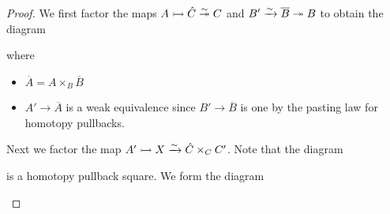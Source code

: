 \begin{lemma}
\begin{proof}
        We first factor the maps $A\xtailrightarrow{}\hat{C}\xtwoheadrightarrow[]{\sim} C$ and $B'\xrightarrow{\sim}\overline{B}\xtwoheadrightarrow{} B$ to obtain the diagram
        \begin{center}
        \end{center}
        where 
        \begin{itemize}
            \item $\overline{A}=A\times_{B}\overline{B}$
            \item $A'\to \overline{A}$ is a weak equivalence since $B'\to\overline{B}$ is one by the pasting law for homotopy pullbacks.
        \end{itemize}
        Next we factor the map $A'\xtailrightarrow{}X\xrightarrow{\sim}\hat{C}\times_CC'$. 
        Note that the diagram 
        \begin{center}
        \end{center}
        is a homotopy pullback square.
        We form the diagram
        \begin{center}
\end{center}
\end{proof}
\end{lemma}
